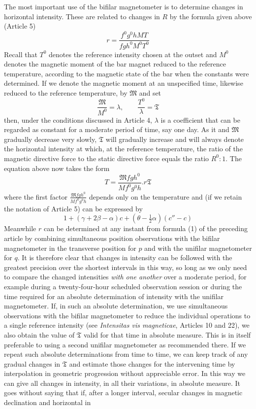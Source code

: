 The most important use of the bifilar magnetometer is to determine changes in horizontal intensity. These are related to changes in $R$ by the formula given above (Article 5)
\[
r=\frac{f^0g^0hMT}{fgh^0M^0T^0}
\]
Recall that $T^0$ denotes the reference intensity chosen at the outset and $M^0$ denotes the magnetic moment of the bar magnet reduced to the reference temperature, according to the magnetic state of the bar when the constants were determined. If we denote the magnetic moment at an unspecified time, likewise reduced to the reference temperature, by $\mathfrak{M}$ and set
\[
\frac{\mathfrak{M}}{M^0}=\lambda,\qquad\frac{T^0}{\lambda}=\mathfrak{T}
\]
then, under the conditions discussed in Article 4, $\lambda$ is a coefficient that can be regarded as constant for a moderate period of
time, say one day. As it and $\mathfrak{M}$ gradually decrease very slowly, $\mathfrak{T}$ will gradually increase and will always denote the horizontal intensity at which, at the reference temperature, the ratio of the magnetic directive force to the static directive force equals the ratio $R^0:1$. The equation above now takes the form
\[
T=\frac{\mathfrak{M}fgh^0}{Mf^0g^0h}.r\mathfrak{T}
\]
where the first factor $\frac{\mathfrak{M}fgh^0}{Mf^0g^0h}$ depends only on the temperature and (if we retain the notation of Article 5) can be expressed by
\[
1+(\gamma+2\beta-\alpha)c+(\theta-\tfrac12\alpha)(c''-c)
\]
Meanwhile $r$ can be determined at any instant from formula (1) of the preceding article by combining simultaneous position observations with the bifilar magnetometer in the transverse position for $p$ and with the unifilar magnetometer for $q$. It is therefore clear that changes in intensity can be followed with the greatest precision over the shortest intervals in this way, so long as we only need to compare the changed intensities \textit{with one another} over a moderate period, for example during a twenty-four-hour scheduled observation session or during the time required for an absolute determination of intensity with the unifilar magnetometer. If, in such an absolute determination, we use simultaneous observations with the bifilar magnetometer to reduce the individual operations to a single reference intensity (see \textit{Intensitas vis magneticae}, Articles 10 and 22), we also obtain the value of $\mathfrak{T}$ valid for that time in absolute measure. This is in itself preferable to using a second unifilar magnetometer as recommended there. If we repeat such absolute determinations from time to time, we can keep track of any gradual changes in $\mathfrak{T}$ and estimate those changes for the intervening time by interpolation in geometric progression without appreciable error. In this way we can give all changes in intensity, in all their variations, in absolute measure. It goes without saying that if, after a longer interval, secular changes in magnetic declination and horizontal in%
